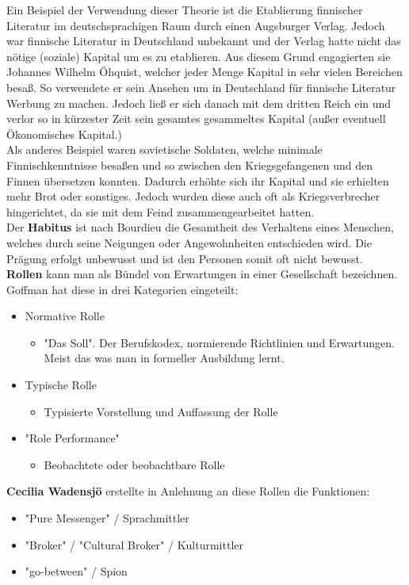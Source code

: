 \documentclass{article}
\begin{document}
	Ein Beispiel der Verwendung dieser Theorie ist die Etablierung finnischer Literatur im deutschsprachigen Raum durch einen Augsburger Verlag. Jedoch war finnische Literatur in Deutschland unbekannt und der Verlag hatte nicht das nötige (soziale) Kapital um es zu etablieren. Aus diesem Grund engagierten sie Johannes Wilhelm Öhquist, welcher jeder Menge Kapital in sehr vielen Bereichen besaß. So verwendete er sein Ansehen um in Deutschland für finnische Literatur Werbung zu machen. Jedoch ließ er sich danach mit dem dritten Reich ein und verlor so in kürzester Zeit sein gesamtes gesammeltes Kapital (außer eventuell Ökonomisches Kapital.) \\
	Als anderes Beispiel waren sovietische Soldaten, welche minimale Finnischkenntnisse besaßen und so zwischen den Kriegsgefangenen und den Finnen übersetzen konnten. Dadurch erhöhte sich ihr Kapital und sie erhielten mehr Brot oder sonstiges. Jedoch wurden diese auch oft als Kriegsverbrecher hingerichtet, da sie mit dem Feind zusammengearbeitet hatten. \\
	Der \textbf{Habitus} ist nach Bourdieu die Gesamtheit des Verhaltens eines Menschen, welches durch seine Neigungen oder Angewohnheiten entschieden wird. Die Prägung erfolgt unbewusst und ist den Personen somit oft nicht bewusst. \\
	\textbf{Rollen} kann man als Bündel von Erwartungen in einer Gesellschaft bezeichnen. Goffman hat diese in drei Kategorien eingeteilt: 
	\begin{itemize}
		\item{Normative Rolle}
		\begin{itemize}
			\item{"Das Soll". Der Berufskodex, normierende Richtlinien und Erwartungen. Meist das was man in formeller Ausbildung lernt.}
		\end{itemize}
		\item{Typische Rolle}
		\begin{itemize}
			\item{Typisierte Vorstellung und Auffassung der Rolle}
		\end{itemize}
		\item{"Role Performance"}
		\begin{itemize}
			\item{Beobachtete oder beobachtbare Rolle}
		\end{itemize}
	\end{itemize}
	\textbf{Cecilia Wadensjö} erstellte in Anlehnung an diese Rollen die Funktionen:
	\begin{itemize}
		\item{"Pure Messenger" / Sprachmittler}
		\item{"Broker" / "Cultural Broker" / Kulturmittler}
		\item{"go-between" / Spion}
	\end{itemize}
\end{document}
